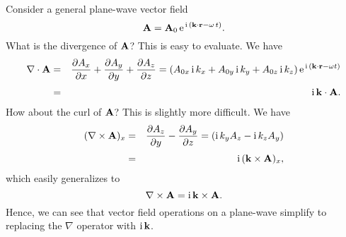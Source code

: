Consider a general plane-wave vector field
\begin{equation}
{\bf A} =  {\bf A}_0 \,{\rm e}^{\,{\rm i}\,({\bf k}\cdot{\bf r} - \omega \,t)}.
\end{equation}
What is the divergence of ${\bf A}$? This is easy to evaluate. We have
\begin{eqnarray}
\nabla\cdot{\bf A} &=&\frac{\partial A_x}{\partial x}+
\frac{\partial A_y}{\partial y}+\frac{\partial A_z}{\partial z} 
= (A_{0x} \,{\rm i}\, k_x +A_{0y} \,{\rm i}\, k_y +A_{0z} \,{\rm i}\, k_z)
\,{\rm e}^{\,{\rm i}\,({\bf k}\cdot{\bf r} - \omega t)}\nonumber\\[0.5ex]
&=&
{\rm i}\, {\bf k}\cdot {\bf A}.\label{e4.66}
\end{eqnarray}
How about the curl of ${\bf A}$? This is slightly more difficult. We have
\begin{eqnarray}
(\nabla\times{\bf A})_x &=& \frac{\partial A_z}{\partial y}
-\frac{\partial A_y}{\partial z} = ({\rm i}\,k_y A_z - {\rm i}\,
k_z A_y)\nonumber\\[0.5ex]
&=& {\rm i}\,({\bf k} \times {\bf A})_x,
\end{eqnarray}
which easily generalizes to
\begin{equation}
\nabla\times{\bf A} = {\rm i}\, {\bf k} \times{\bf A}.\label{e4.68}
\end{equation}
Hence, we can see that vector field operations on a plane-wave simplify to 
replacing the $\nabla$ operator with ${\rm i}\,{\bf k}$.

